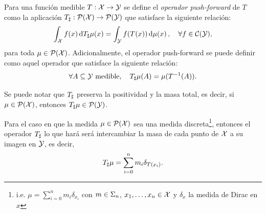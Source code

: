 {  \begin{definition}
	  Para una función medible $T:\cX \to \cY$ se define el \emph{operador push-forward} de $T$ como la aplicación $\Tpf:\ProbSpace[\cX] \to \ProbSpace[\cY]$ que satisface la siguiente relación:
	  \begin{equation}
		  \int_{\cX} f(x) \dd{\Tpf\mu(x)} = \int_{\cY} f(T(x)) \dmu[x], \quad \forall f \in \mathcal{C}(\cY),
	  \end{equation}
	  para toda $\mu \in \ProbSpace[\cX]$. Adicionalmente, el operador push-forward se puede definir como aquel operador que satisface la siguiente relación:
	  \begin{equation}
		  \label{eq:pushForward2}
		  \forall A \subseteq \cY \text{ medible}, \quad \Tpf\mu(A) = \mu(T^{-1}(A)).
	  \end{equation}
  \end{definition}

  \begin{remark}
	  Se puede notar que $\Tpf$ preserva la positividad y la masa total, es decir, si $\mu \in \ProbSpace[\cX]$, entonces $\Tpf\mu \in \ProbSpace[\cY]$.
  \end{remark}

  \begin{remark}
	  Para el caso en que la medida $\mu \in \ProbSpace$ sea una medida discreta\footnote{i.e. $\mu = \sum_{i=0}^{n} m_i \delta_{x_i}$ con $m\in\Simplex$, $x_1,\ldots, x_n\in\cX$ y $\delta_x$ la medida de Dirac en $x$}, entonces el operador $\Tpf$ lo que hará será intercambiar la masa de cada punto de $\cX$ a su imagen en $\cY$, es decir,
	  \begin{equation}
		  \label{eq:pushForwardDiscreto}
		  \Tpf\mu = \sum_{i=0}^{n} m_i \delta_{T(x_i)}.
	  \end{equation}

  \end{remark}



 }

